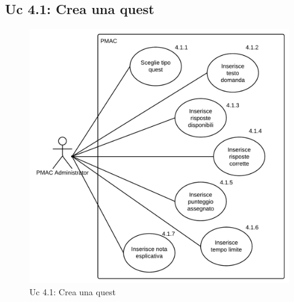 \documentclass[10pt,a4paper]{article}
\begin{document}
\newpage

\subsection{Uc 4.1: Crea una quest}
\begin{figure}[ht]
\centering
\caption{Uc 4.1: Crea una quest}
\includegraphics[scale=0.9]{UseCase/Uc4_1} %
\end{figure}
\end{document}
